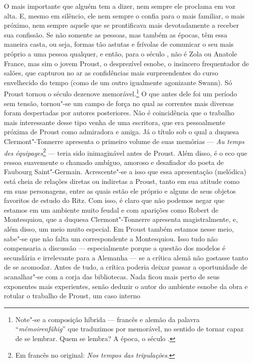 O mais importante que alguém tem a dizer, nem sempre ele proclama em voz
alta. E, mesmo em silêncio, ele nem sempre o confia para o mais
familiar, o mais próximo, nem sempre aquele que se prontificava mais
devotadamente a receber sua confissão. Se não somente as pessoas, mas
também as épocas, têm essa maneira casta, ou seja, formas tão astutas e
frívolas de comunicar o seu mais próprio a uma pessoa qualquer, e então,
para o século , não é Zola ou Anatole France, mas sim o jovem Proust,
o desprezível esnobe, o insincero frequentador de salões, que capturou
no ar as confidências mais surpreendentes do curso envelhecido do tempo
(como de um outro igualmente agonizante Swann). Só Proust tornou o
século dezenove memorável.\footnote{Note"-se a composição híbrida ---
  francês e alemão da palavra ``\emph{mémoirenfähig}'' que traduzimos
  por memorável, no sentido de tornar capaz de se lembrar. Quem se
  lembra? A época, o século . \versal{[N.~T.]}} O que antes dele foi um período sem
tensão, tornou"-se um campo de força no qual as correntes mais diversas
foram despertadas por autores posteriores. Não é coincidência que o
trabalho mais interessante desse tipo venha de uma escritora, que era
pessoalmente próxima de Proust como admiradora e amiga. Já o título sob
o qual a duquesa Clermont"-Tonnerre apresenta o primeiro volume de suas
memórias --- \emph{Au temps des équipages}\footnote{Em francês no original: \emph{Nos tempos das tripulações}. \versal{[N.~T.]}} --- teria sido inimaginável antes de
Proust. Além disso, é o eco que ressoa suavemente o chamado ambíguo,
amoroso e desafiador do poeta de Faubourg Saint"-Germain. Acrescente"-se a
isso que essa apresentação (melódica) está cheia de relações diretas ou
indiretas a Proust, tanto em sua atitude como em suas personagens, entre
as quais estão ele próprio e alguns de seus objetos favoritos de estudo
do Ritz. Com isso, é claro que não podemos negar que estamos em um
ambiente muito feudal e com aparições como Robert de Montesquiou, que a
duquesa Clermont"-Tonnerre apresenta magistralmente, e, além disso, um
meio muito especial. Em Proust também estamos nesse meio, sabe"-se que
não falta um correspondente a Montesquiou. Isso tudo não compensaria a
discussão --- especialmente porque a questão dos modelos é secundária e
irrelevante para a Alemanha --- se a crítica alemã não gostasse tanto de
se acomodar. Antes de tudo, a crítica poderia deixar passar a
oportunidade de acanalhar"-se com a corja das bibliotecas. Nada ficou
mais perto de seus exponentes mais experientes, senão deduzir o autor do
ambiente esnobe da obra e rotular o trabalho de Proust, um caso interno

